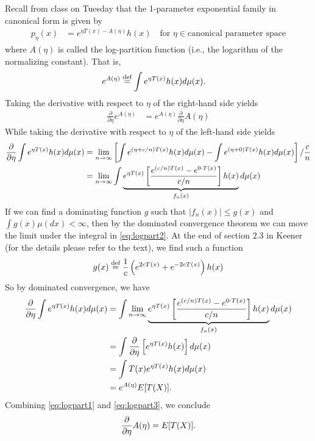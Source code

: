 \documentclass[twoside]{article}
\newcommand{\defeq}{\buildrel \text{d{}ef}\over =}
\begin{document}
\begin{example}\citep[p.~29]{keener}
Recall from class on Tuesday that the 1-parameter exponential family in
canonical form is given by
\begin{align*}
  p_\eta(x) &= e^{\eta T(x) - A(\eta)} h(x) \quad \text{for }
  \eta \in \text{canonical parameter space}
\end{align*}
where $A(\eta)$ is called the log-partition function (i.e., the
logarithm of the normalizing constant).  That is,
\begin{align*}
  e^{A(\eta)} &\defeq \int e^{\eta T(x)} h(x) d\mu(x).
\end{align*}
Taking the derivative with respect to $\eta$ of the right-hand side yields
\begin{align}\label{eq:logpart1}
  \frac{\partial}{\partial \eta} e^{A(\eta)} &= e^{A(\eta)}
    \frac{\partial}{\partial \eta}A(\eta)
\end{align}
While taking the derivative with respect to $\eta$ of the left-hand side
yields
\begin{align}
  \frac{\partial}{\partial \eta} \int e^{\eta T(x)} h(x) d\mu(x)
  &= \lim_{n \rightarrow \infty} \left[ \int e^{(\eta + c/n)T(x)} h(x) d\mu(x) -
  \int e^{(\eta + 0)T(x)} h(x) d\mu(x) \right]/ \frac{c}{n} \notag\\
  &= \lim_{n \rightarrow \infty} \int \underbrace{e^{\eta T(x)} \left[
  \frac{e^{(c/n)T(x)} - e^{0 \cdot T(x)}}{c/n} \right] h(x)}_{f_n(x)} d\mu(x) \label{eq:logpart2}
\end{align}
If we can find a dominating function $g$ such that $|f_n(x)| \le g(x)$ and
$\int g(x) \mu(dx) < \infty$, then by the dominated convergence theorem we
can move the limit under the integral in \eqref{eq:logpart2}. At the end of
section $2.3$ in Keener (for the details please refer to the text), we find
such a function
\begin{align*}
g(x) \defeq \frac{1}{c} \left(e^{2cT(x)} + e^{-2cT(x)} \right)h(x)
\end{align*}
So by dominated convergence, we have
\begin{align}
   \frac{\partial}{\partial \eta} \int e^{\eta T(x)} h(x) d\mu(x)
  &=  \int \lim_{n \rightarrow \infty}\underbrace{e^{\eta T(x)} \left[
  \frac{e^{(c/n)T(x)} - e^{0 \cdot T(x)}}{c/n} \right] h(x)}_{f_n(x)} d\mu(x) \notag\\
  &= \int \frac{\partial}{\partial \eta} \left[e^{\eta T(x)} h(x)\right]  d\mu(x) \notag\\
  &= \int T(x) e^{\eta T(x)} h(x) d\mu(x)  \notag\\
  &= e^{A(\eta)} E[T(X)]. \label{eq:logpart3}
\end{align}
Combining \eqref{eq:logpart1} and \eqref{eq:logpart3}, we conclude
\begin{align*}
\frac{\partial}{\partial \eta} A(\eta) = E[T(X)].
\end{align*}
\end{example}




\end{document}
